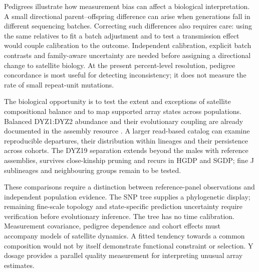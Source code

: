 Pedigrees illustrate how measurement bias can affect a biological interpretation. A small directional parent--offspring difference can arise when generations fall in different sequencing batches. Correcting such differences also requires care: using the same relatives to fit a batch adjustment and to test a transmission effect would couple calibration to the outcome. Independent calibration, explicit batch contrasts and family-aware uncertainty are needed before assigning a directional change to satellite biology. At the present percent-level resolution, pedigree concordance is most useful for detecting inconsistency; it does not measure the rate of small repeat-unit mutations.

The biological opportunity is to test the extent and exceptions of satellite compositional balance and to map supported array states across populations. Balanced DYZ1:DYZ2 abundance and their evolutionary coupling are already documented in the assembly resource \cite{Hallast2026}. A larger read-based catalog can examine reproducible departures, their distribution within lineages and their persistence across cohorts. The DYZ19 separation extends beyond the males with reference assemblies, survives close-kinship pruning and recurs in HGDP and SGDP; fine J sublineages and neighbouring groups remain to be tested.

These comparisons require a distinction between reference-panel observations and independent population evidence. The SNP tree supplies a phylogenetic display; remaining fine-scale topology and state-specific prediction uncertainty require verification before evolutionary inference. The tree has no time calibration. Measurement covariance, pedigree dependence and cohort effects must accompany models of satellite dynamics. A fitted tendency towards a common composition would not by itself demonstrate functional constraint or selection. Y dosage provides a parallel quality measurement for interpreting unusual array estimates.

